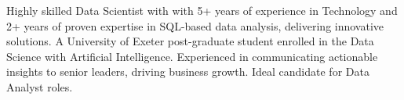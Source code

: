 
\vspace{-1mm}
\color{sectiondivider}\vhrulefill{0.9pt}
\begin{cvparagraph}

Highly skilled Data Scientist with with 5+ years of experience in Technology and 2+ years of proven expertise in SQL-based data analysis, delivering innovative solutions. A University of Exeter post-graduate student enrolled in the Data Science with Artificial Intelligence. Experienced in communicating actionable insights to senior leaders, driving business growth. Ideal candidate for Data Analyst roles.
%
\end{cvparagraph}
